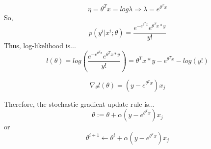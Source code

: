 \begin{answer}
	\begin{equation*}
	    \eta = \theta^{T}x = log \lambda \Rightarrow \lambda = e^{\theta^{T}x}
	\end{equation*}
	So,
	\begin{equation*}
	    p(y^{i}|x^{i};\theta) = \frac{e^{-e^{\theta^{T}x}}e^{\theta^{T}x*y}}{y!}
	\end{equation*}
	Thus, log-likelihood is...
	\begin{equation*}
	    l(\theta) =log(\frac{e^{-e^{\theta^{T}x}}e^{\theta^{T}x*y}}{y!}) = \theta^{T}x*y-e^{\theta^{T}x} - log(y!)
	\end{equation*}
	
	\begin{equation*}
	    \nabla_\theta l(\theta) = (y - e^{\theta^{T}x})x_j
	\end{equation*}
	
	Therefore, the stochastic gradient update rule is...
	\begin{equation*}
	    \theta := \theta + \alpha (y - e^{\theta^{T}x})x_j
	\end{equation*}
	or
	\begin{equation*}
	    \theta^{i+1} \leftarrow  \theta^{i} + \alpha (y - e^{\theta^{T}x})x_j
	\end{equation*}
\end{answer}
